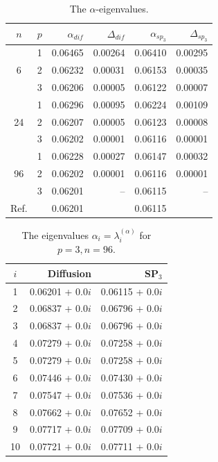 \documentclass[authoryear]{elsarticle}
\begin{document}
\begin{table}[h]
\caption{The $\alpha$-eigenvalues.}
\label{tab:iaea_without_alpha_del}
\begin{center}
\begin{tabular}{c c r r r r}
\hline
$n$ & $p$ & $\alpha_{dif}$ & $\Delta_{dif}$ &$\alpha_{sp_3}$& $\Delta_{sp_3}$ \\
\hline
	& 1	&0.06465 &0.00264&0.06410 & 0.00295\\
6	& 2	&0.06232 &0.00031&0.06153 & 0.00035\\
	& 3	&0.06206 &0.00005&0.06122 & 0.00007\\ 
\hline
	& 1	&0.06296 &0.00095&0.06224 & 0.00109\\
24& 2	&0.06207 &0.00005&0.06123 & 0.00008\\
	& 3	&0.06202 &0.00001&0.06116 & 0.00001\\ 
\hline
	& 1	&0.06228 &0.00027&0.06147 & 0.00032\\
96& 2	&0.06202 &0.00001&0.06116 & 0.00001\\
	& 3	&0.06201 &     --&0.06115 &      --\\ 
\hline
Ref.& & 0.06201 & & 0.06115 \\ 
\hline
\end{tabular}
\end{center}
\end{table}

\begin{table}[h]
\caption{The eigenvalues $\alpha_i=\lambda_i^{(\alpha)}$ for $p=3, n=96$.}
\label{tab:iaea_without_alpha_del_10}
\begin{center}
\begin{tabular}{c r r}
\hline
$i$ & Diffusion & SP$_3$ \\
\hline
1& 0.06201 + 0.0$i$&0.06115 + 0.0$i$\\
2& 0.06837 + 0.0$i$&0.06796 + 0.0$i$\\
3& 0.06837 + 0.0$i$&0.06796 + 0.0$i$\\
4& 0.07279 + 0.0$i$&0.07258 + 0.0$i$\\
5& 0.07279 + 0.0$i$&0.07258 + 0.0$i$\\
6& 0.07446 + 0.0$i$&0.07430 + 0.0$i$\\
7& 0.07547 + 0.0$i$&0.07536 + 0.0$i$\\
8& 0.07662 + 0.0$i$&0.07652 + 0.0$i$\\
9& 0.07717 + 0.0$i$&0.07709 + 0.0$i$\\
10& 0.07721 + 0.0$i$&0.07711 + 0.0$i$\\
\hline
\end{tabular}
\end{center}
\end{table}
\end{document}
